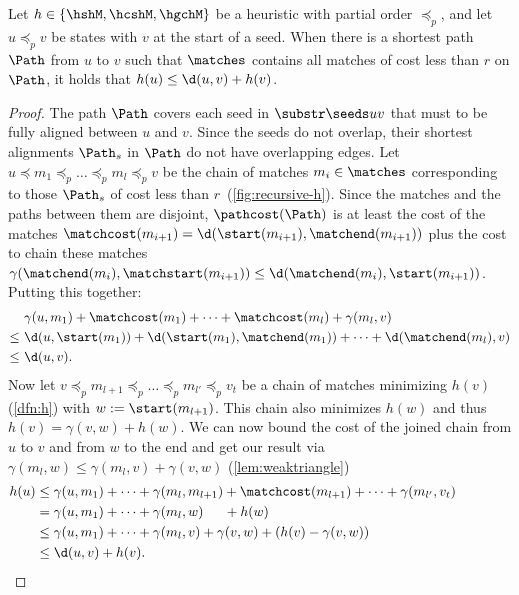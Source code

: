 \begin{lem}\label{lem:weakconsistency}
  Let $h\in \{\hshM, \hcshM, \hgchM\}$ be a heuristic with partial order
  $\preceq_p$, and let $u \preceq_p v$ be states with $v$ at the start of a seed.
  When there is a shortest path $\Path$ from $u$ to $v$ such that $\matches$
  contains all matches of cost less than $r$ on $\Path$, it holds that
  $h(u) \leq \d(u, v) + h(v)$.
\end{lem}
\begin{proof}
  The path $\Path$ covers each seed in $\substr \seeds uv$ that must to be fully
  aligned between $u$ and $v$. Since the seeds do not overlap, their shortest
  alignments $\Path_s$ in $\Path$ do not have overlapping edges. Let $u\preceq
  m_1 \preceq_p \dots \preceq_p m_{l} \preceq_p v$ be the chain of matches $m_i
  \in \matches$ corresponding to those $\Path_s$ of cost less than
  $r$~(\cref{fig:recursive-h}). Since the matches and the paths between them are
  disjoint, $\pathcost(\Path)$ is at least the cost of the matches
  $\matchcost(m_{i+1}) = \d(\start(m_{i+1}), \matchend(m_{i+1}))$ plus the cost
  to chain these matches $\gamma(\matchend(m_i), \matchstart(m_{i+1})) \leq
  \d(\matchend(m_i), \start(m_{i+1}))$. Putting this together:
  \begin{align*}
    &\gamma(u, m_1) + \matchcost(m_1) + \dots + \matchcost(m_l) + \gamma(m_l, v)\\
    \leq\ &\d(u, \start(m_1)) + \d(\start(m_1), \matchend(m_1)) + \dots +
          \d(\matchend(m_l), v)\\
    \leq\ & \d(u, v).
  \end{align*}
  Now let $v\preceq_p m_{l+1} \preceq_p \dots \preceq_p m_{l'} \preceq_p v_t$ be a chain of
  matches minimizing $h(v)$ (\cref{dfn:h}) with $w:= \start(m_{l+1})$. This
  chain also minimizes $h(w)$ and thus $h(v) = \gamma(v, w) + h(w)$. We can now
  bound the cost of the joined chain from $u$ to $v$ and from $w$ to the end and
  get our result via $\gamma(m_l, w) \leq \gamma(m_l, v) + \gamma(v, w)$ (\cref{lem:weaktriangle})
  \begin{align*}
    h(u)
    &\leq\gamma(u, m_1) + \dots+\gamma(m_l, m_{l+1}) +\matchcost(m_{l+1}) + \dots + \gamma(m_{l'}, v_t)\\
    &= \gamma(u, m_1) + \dots + \gamma(m_l, w) \hspace{1.5em}+ h(w)\\
    &\leq \gamma(u, m_1) + \dots + \gamma(m_l, v) + \gamma(v, w)+(h(v)-\gamma(v, w))\\
    &\leq \d(u, v) + h(v). && \tag*{\qed}
  \end{align*}
  \let\qed\relax
\end{proof}

